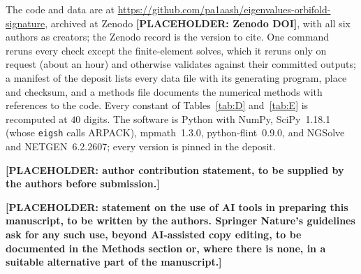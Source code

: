 \documentclass[pdflatex,sn-mathphys-num]{sn-jnl}
\theoremstyle{thmstyleone}%
\theoremstyle{thmstylethree}%
\begin{document}
The code and data are at \url{https://github.com/pa1aash/eigenvalues-orbifold-signature}, archived at Zenodo \textbf{[PLACEHOLDER: Zenodo DOI]}, with all six authors as creators; the Zenodo record is the version to cite. One command reruns every check except the finite-element solves, which it reruns only on request (about an hour) and otherwise validates against their committed outputs; a manifest of the deposit lists every data file with its generating program, place and checksum, and a methods file documents the numerical methods with references to the code. Every constant of Tables~\ref{tab:D} and~\ref{tab:E} is recomputed at $40$ digits. The software is Python with NumPy, SciPy~1.18.1 (whose \texttt{eigsh} calls ARPACK), mpmath~1.3.0, python-flint~0.9.0, and NGSolve and NETGEN~6.2.2607; every version is pinned in the deposit.

\textbf{[PLACEHOLDER: author contribution statement, to be supplied by the authors before submission.]}

\textbf{[PLACEHOLDER: statement on the use of AI tools in preparing this manuscript, to be written by the authors. Springer Nature's guidelines ask for any such use, beyond AI-assisted copy editing, to be documented in the Methods section or, where there is none, in a suitable alternative part of the manuscript.]}
\end{document}
